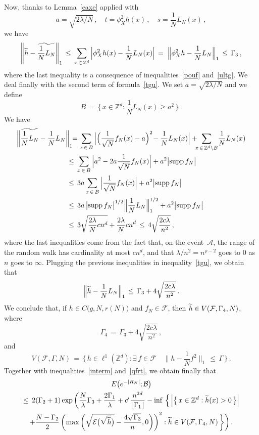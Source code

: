 \documentclass[10pt]{amsart}
\theoremstyle{definition}\newtheorem{defi}[theo]{Definition}\newtheorem{rema}[theo]{Remark}\newtheorem{exam}[theo]{Example}\newtheorem{exem}[theo]{Example}\newtheorem{nota}[theo]{Notation}
\newcommand*\supp{\text{supp\,}}
\newcommand*\Zd {{\mathbb Z^d}}
\newcommand*\wh{{\tilde h}}
\newcommand{\cA}{\mathcal{A}}
\newcommand{\cB}{\mathcal{B}}
\newcommand{\cE}{\mathcal{E}}
\newcommand{\cF}{\mathcal{F}}
\let\oldtilde\tilde
\renewcommand*{\tilde}[1]{\mathchoice{\widetilde{#1}}{\widetilde{#1}}{\oldtilde{#1}}{\oldtilde{#1}}}\let\oldhat\hat
\renewcommand*{\hat}[1]{\mathchoice{\widehat{#1}}{\widehat{#1}}{\oldhat{#1}}{\oldhat{#1}}}\let\oldexists\exists
\renewcommand*{\exists}{\mathrel{\oldexists}}
\begin{document}
Now, thanks to Lemma~\ref{eaxe} applied with
\[
a=\sqrt{{2\lambda}/{N}}\,,\quad t=\phi_X^2h(x)\,,\quad
s=\frac{1}{N}L_N(x)\,,
\]
we have
\[
\left\|\wh-\widetilde{\frac{1}{N}L_N}\right\|_{1}\,\leq\,
\sum_{x\,\in\,\Zd}\Big|\phi_X^2h(x)-\frac{1}{N}L_N(x)\Big|
\,=\;
\Big\|\phi_X^2h-{\frac{1}{N}L_N}\Big\|_{1}
\,\leq\,\Gamma_3
\,,
\]
where the last inequality is a consequence of inequalities~\eqref{pouf} and~\eqref{ultg}. We deal finally with the second term of formula~\eqref{tgu}. We set $a=\sqrt{{2\lambda}/{N}}$ and we define
\[
B\,=\,\Big\{\,x\in \Zd:
\frac{1}{N}L_N(x)\geq a^2
\,\Big\}\,.
\]
We have
\begin{align*}
\bigg\| {\widetilde {\frac{1}{N}L_N}}-
\frac{1}{N}L_N &\bigg\|_{1}
\!\!=
\sum_{x\,\in\,B}\Big|
\Big(\frac{1}{\sqrt N}f_N(x)-a\Big)^2
\!-\frac{1}{N}L_N(x)
\Big| +
\!\!\!
\sum_{x\,\in\,\Zd\setminus B}
\!
\frac{1}{N}L_N(x)
\\ &\,\leq\,
\sum_{x\,\in\,B}
\Big|a^2-2a\frac{1}{\sqrt N}f_N(x)\Big| +a^2\big|\supp f_N\big|
\\ &\,\leq\, 3a\sum_{x\,\in\,B}
\Big|\frac{1}{\sqrt N}f_N(x)\Big| +a^2\big|\supp f_N\big|
\\ &\,\leq\, 3a\,
\big|\supp f_N\big|^{1/2}
\Big\|
\frac{1}{N}L_N\Big\|_{1}^{1/2} +a^2\big|\supp f_N\big|\\ &\,\leq\, 3\sqrt{\frac{2\lambda}{N}cn^d} + {\frac{2\lambda}{N}cn^d}
\,\leq\, 4\sqrt{\frac{2c\lambda}{n^2}}
\,,
\end{align*}
where the last inequalities come from the fact that, on the event~$\cA$, the range of the random walk has cardinality at most $cn^d$, and that $\lambda/n^2=n^{\rho-2}$ goes to $0$ as $n$ goes to $\infty$. Plugging the previous inequalities in inequality~\eqref{tgu}, we obtain that
\[
\Big\|\wh-\frac{1}{N}L_N\Big\|_{1}
\,\leq\,
\Gamma_3+4\sqrt{\frac{2c\lambda}{n^2}}\,.
\]
We conclude that, if $h\in C\big(g,N,r(N)\big)$ and $f_N\in\cF$, then $\wh\in V(\cF,\Gamma_4,N)$, where
\[
\Gamma_4\,=\,\Gamma_3+4\sqrt{\frac{2c\lambda}{n^2}}\,,
\]
and
\begin{equation*}
V(\cF,\Gamma,N)\,=\,\Big\{\, h\in \ell^1\left(\Zd\right):
\exists\,f\in\cF\quad
\Big\|h-\frac{1}{N}f^2\Big\|_{1}
\,\leq\,\Gamma
\,\Big\}\,.\label{prox}
\end{equation*}
Together with inequalities~\eqref{interm} and~\eqref{qfrt}, we obtain finally that
\begin{multline*}
E\big(e^{-|R_N|};
\cB
\big)\\
\leq\, 2(\Gamma_2+1)
\exp\bigg(\frac{N}{\lambda}\Gamma_3 +\frac{2\Gamma_1}{\lambda} + c'\frac{n^{2d}}{\lfloor\Gamma_1\rfloor}
-\inf\,\Big\{\,
\Big|\big\{\,x\in\Zd:\wh(x)>0\,\big\}\Big|
\\
+\frac{N-\Gamma_2}{2}
\left(\max\left(
\sqrt{\cE\big(\sqrt{\wh}\big)}-
\frac{4\sqrt{\Gamma_3}}{n},0\right)\right)^2 : \wh\in V(\cF,\Gamma_4,N)
\,\bigg\}\bigg)
\,.
\end{multline*}
\end{document}
